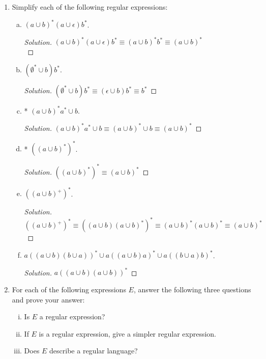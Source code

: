 \documentclass[10pt]{article}
\begin{document}
\begin{enumerate}[1)]
\item
Simplify each of the following regular expressions:
\begin{enumerate}[a)]
\item
$(a \cup b)^* (a \cup \epsilon) b^*$.
\begin{proof}[Solution]
$(a \cup b)^* (a \cup \epsilon) b^* \equiv (a \cup b)^* b^* \equiv (a \cup b)^*$\\
\end{proof}
\item
$(\emptyset ^* \cup b) b^*$.
\begin{proof}[Solution]
$(\emptyset ^* \cup b) b^* \equiv (\epsilon \cup b)b^* \equiv b^*$
\end{proof}
\item
* $(a \cup b)^*a^* \cup b$.
\begin{proof}[Solution]
$(a \cup b)^*a^* \cup b \equiv (a \cup b)^* \cup b \equiv (a \cup b)^*$
\end{proof}
\item
* $((a \cup b)^*)^*$.
\begin{proof}[Solution]
$((a \cup b)^*)^* \equiv (a \cup b)^*$
\end{proof}

\pagebreak
\item
$((a \cup b)^+)^*$.
\begin{proof}[Solution]
$((a \cup b)^+)^* \equiv ((a \cup b)(a \cup b)^*)^* \equiv (a \cup b)^*(a \cup b)^* \equiv (a \cup b)^*$
\end{proof}
\item
$a ( (a \cup b)(b \cup a) )^* \cup a ( (a \cup b) a )^* \cup a ( (b \cup a) b )^*$.
\begin{proof}[Solution]
$a ( (a \cup b)(a \cup b) )^*$
\end{proof}
\end{enumerate}
\item
For each of the following expressions $E$, answer the following three questions and prove your answer:
\begin{center}
\begin{enumerate}[(i)]
\item
Is $E$ a regular expression?

\item
If $E$ is a regular expression, give a simpler regular expression.

\item
Does $E$ describe a regular language?
\end{enumerate}
\end{center}


\end{enumerate}
\end{document}
